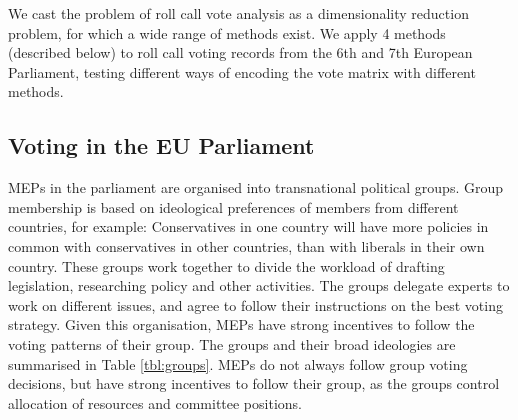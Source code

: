 \documentclass{llncs}
\begin{document}
We cast the problem of roll call vote analysis as a dimensionality reduction problem, for which a wide range of methods exist. We apply 4 methods (described below) to roll call voting records from the 6th and 7th European Parliament, testing different ways of encoding the vote matrix with different methods.

\subsection{Voting in the EU Parliament}
MEPs in the parliament are organised into transnational political groups. Group membership is based on ideological preferences of members from different countries, for example: Conservatives in one country will have more policies in common with conservatives in other countries, than with liberals in their own country. These groups work together to divide the workload of drafting legislation, researching policy and other activities. The groups delegate experts to work on different issues, and agree to follow their instructions on the best voting strategy. Given this organisation, MEPs have strong incentives to follow the voting patterns of their group\cite{Hix821}. The groups and their broad ideologies are summarised in Table \ref{tbl:groups}. MEPs do not always follow group voting decisions, but have strong incentives to follow their group, as the groups control allocation of resources and committee positions.
\end{document}
